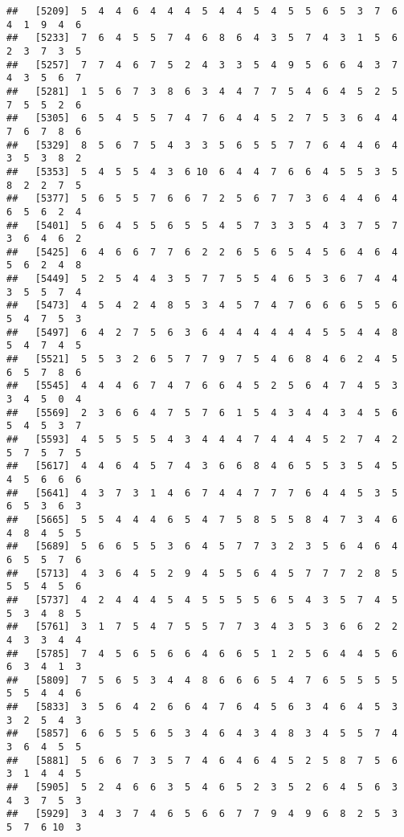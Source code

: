 \documentclass[
]{book}
\begin{document}
\begin{verbatim}
##   [5209]  5  4  4  6  4  4  4  5  4  4  5  4  5  5  6  5  3  7  6  4  1  9  4  6
##   [5233]  7  6  4  5  5  7  4  6  8  6  4  3  5  7  4  3  1  5  6  2  3  7  3  5
##   [5257]  7  7  4  6  7  5  2  4  3  3  5  4  9  5  6  6  4  3  7  4  3  5  6  7
##   [5281]  1  5  6  7  3  8  6  3  4  4  7  7  5  4  6  4  5  2  5  7  5  5  2  6
##   [5305]  6  5  4  5  5  7  4  7  6  4  4  5  2  7  5  3  6  4  4  7  6  7  8  6
##   [5329]  8  5  6  7  5  4  3  3  5  6  5  5  7  7  6  4  4  6  4  3  5  3  8  2
##   [5353]  5  4  5  5  4  3  6 10  6  4  4  7  6  6  4  5  5  3  5  8  2  2  7  5
##   [5377]  5  6  5  5  7  6  6  7  2  5  6  7  7  3  6  4  4  6  4  6  5  6  2  4
##   [5401]  5  6  4  5  5  6  5  5  4  5  7  3  3  5  4  3  7  5  7  3  6  4  6  2
##   [5425]  6  4  6  6  7  7  6  2  2  6  5  6  5  4  5  6  4  6  4  5  6  2  4  8
##   [5449]  5  2  5  4  4  3  5  7  7  5  5  4  6  5  3  6  7  4  4  3  5  5  7  4
##   [5473]  4  5  4  2  4  8  5  3  4  5  7  4  7  6  6  6  5  5  6  5  4  7  5  3
##   [5497]  6  4  2  7  5  6  3  6  4  4  4  4  4  4  5  5  4  4  8  5  4  7  4  5
##   [5521]  5  5  3  2  6  5  7  7  9  7  5  4  6  8  4  6  2  4  5  6  5  7  8  6
##   [5545]  4  4  4  6  7  4  7  6  6  4  5  2  5  6  4  7  4  5  3  3  4  5  0  4
##   [5569]  2  3  6  6  4  7  5  7  6  1  5  4  3  4  4  3  4  5  6  5  4  5  3  7
##   [5593]  4  5  5  5  5  4  3  4  4  4  7  4  4  4  5  2  7  4  2  5  7  5  7  5
##   [5617]  4  4  6  4  5  7  4  3  6  6  8  4  6  5  5  3  5  4  5  4  5  6  6  6
##   [5641]  4  3  7  3  1  4  6  7  4  4  7  7  7  6  4  4  5  3  5  6  5  3  6  3
##   [5665]  5  5  4  4  4  6  5  4  7  5  8  5  5  8  4  7  3  4  6  4  8  4  5  5
##   [5689]  5  6  6  5  5  3  6  4  5  7  7  3  2  3  5  6  4  6  4  6  5  5  7  6
##   [5713]  4  3  6  4  5  2  9  4  5  5  6  4  5  7  7  7  2  8  5  5  5  4  5  6
##   [5737]  4  2  4  4  4  5  4  5  5  5  5  6  5  4  3  5  7  4  5  5  3  4  8  5
##   [5761]  3  1  7  5  4  7  5  5  7  7  3  4  3  5  3  6  6  2  2  4  3  3  4  4
##   [5785]  7  4  5  6  5  6  6  4  6  6  5  1  2  5  6  4  4  5  6  6  3  4  1  3
##   [5809]  7  5  6  5  3  4  4  8  6  6  6  5  4  7  6  5  5  5  5  5  5  4  4  6
##   [5833]  3  5  6  4  2  6  6  4  7  6  4  5  6  3  4  6  4  5  3  3  2  5  4  3
##   [5857]  6  6  5  5  6  5  3  4  6  4  3  4  8  3  4  5  5  7  4  3  6  4  5  5
##   [5881]  5  6  6  7  3  5  7  4  6  4  6  4  5  2  5  8  7  5  6  3  1  4  4  5
##   [5905]  5  2  4  6  6  3  5  4  6  5  2  3  5  2  6  4  5  6  3  4  3  7  5  3
##   [5929]  3  4  3  7  4  6  5  6  6  7  7  9  4  9  6  8  2  5  3  5  7  6 10  3

\end{verbatim}
\end{document}
